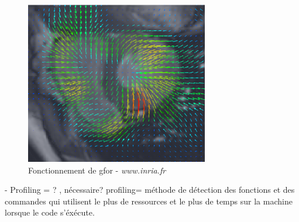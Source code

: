 \documentclass{report}
\begin{document}
\begin{figure}[h!]
	\begin{center}
		\includegraphics[width=8cm]{figures/field.eps}
	\end{center}	
	\caption{Fonctionnement de gfor - \textit{www.inria.fr}}
	\label{Fonctionnement de gfor}
\end{figure}

- Profiling = ? , nécessaire? profiling= méthode de détection des fonctions et des commandes qui utilisent le plus de ressources et le plus de temps sur la machine lorsque le code s'éxécute.



%	
%	
\end{document}
